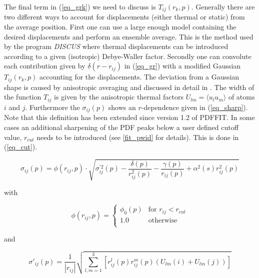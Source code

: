 The final term in (\ref{eq_grk}) we need to discuss is
$T_{ij}(r_{k},p)$. Generally there are two different ways to
account for displacements (either thermal or static) from the
average position. First one can use a large enough model
containing the desired displacements and perform an ensemble
average. This is the method used by the program {\it DISCUS} where
thermal displacements can be introduced according to a given
(isotropic) Debye-Waller factor. Secondly one can convolute each
contribution given by $\delta (r - r_{ij})$ in (\ref{eq_gr}) with
a modified Gaussian $T_{ij}(r_{k},p)$ accounting for the
displacements. The deviation from a Gaussian shape is caused by
anisotropic averaging and discussed in detail in \cite{thlele02}.
The width of the function $T_{ij}$ is given by the anisotropic
thermal factors $U_{lm} = \langle u_{l}u_{m} \rangle$ of atoms $i$
and $j$. Furthermore the $\sigma_{ij}(p)$ shows an $r$-dependence
given in (\ref{eq_sharp}). Note that this definition has been
extended since version 1.2 of PDFFIT. In some cases an additional
sharpening of the PDF peaks below a user defined cutoff value,
$r_{cut}$ needs to be introduced (see \ref{fit_pwid} for details).
This is done in (\ref{eq_cut}).

\begin{equation}
  \sigma_{ij}(p) = \phi(r_{ij},p) \cdot
                   \sqrt {\sigma_{ij}^{'2}(p) -
                          \frac{\delta(p)}{r_{ij}^{2}(p)} -
                          \frac{\gamma(p)}{r_{ij}(p)} +
                          \alpha^{2}(s) r_{ij}^{2}(p)}
  \label{eq_sharp}
\end{equation}

\noindent
with

\begin{equation}
  \phi(r_{ij},p) = \left \{ \begin{array}{ll}
                    \phi_{0}(p) & \mbox{for $r_{ij} < r_{cut}$} \\
                    1.0         & \mbox{otherwise} \\
                    \end{array} \right .
  \label{eq_cut}
\end{equation}

\noindent
and

\begin{equation}
  \sigma'_{ij}(p) = \frac{1}{|r_{ij}|} \sqrt{\sum_{l,m=1}^{3} \left[
                    r^{l}_{ij}(p)r^{m}_{ij}(p) (U_{lm}(i) + U_{lm}(j))
                    \right ]}
  \label{eq_therm}
\end{equation}

